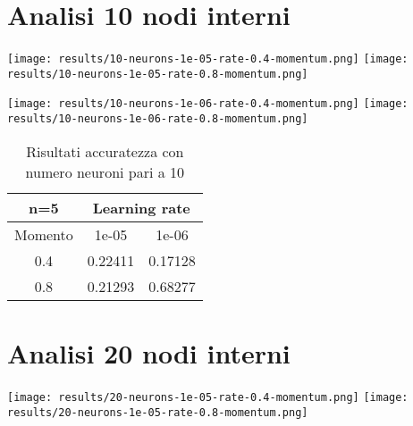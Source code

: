 \section{Analisi 10 nodi interni}
\begin{center}
\texttt{[image: results/10-neurons-1e-05-rate-0.4-momentum.png]}
\texttt{[image: results/10-neurons-1e-05-rate-0.8-momentum.png]}
\end{center}

\begin{center}
\texttt{[image: results/10-neurons-1e-06-rate-0.4-momentum.png]}
\texttt{[image: results/10-neurons-1e-06-rate-0.8-momentum.png]}
\end{center}
\begin{table}[htbp]
    \centering
    \begin{tabular}{|c|c|c|}
    \hline
    n=5 & \multicolumn{2}{c|}{Learning rate} \\
    \hline
    Momento & 1e-05 & 1e-06 \\
    \hline
    0.4 & 0.22411 & 0.17128 \\
    \hline
    0.8 & 0.21293 & 0.68277 \\
    \hline
    \end{tabular}
    \caption{Risultati accuratezza con numero neuroni pari a 10}
\end{table}

\section{Analisi 20 nodi interni}
\begin{center}
\texttt{[image: results/20-neurons-1e-05-rate-0.4-momentum.png]}
\texttt{[image: results/20-neurons-1e-05-rate-0.8-momentum.png]}
\end{center}


